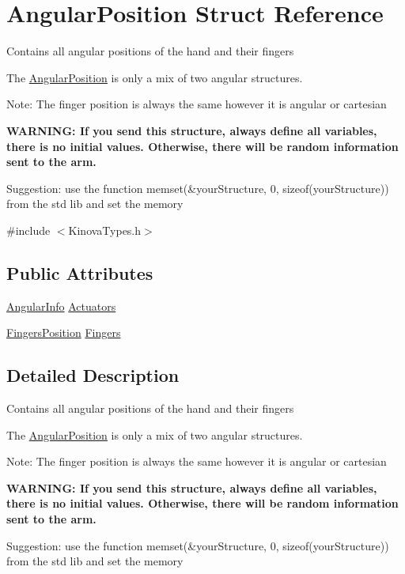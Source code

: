 \hypertarget{struct_angular_position}{\section{Angular\-Position Struct Reference}
\label{struct_angular_position}
}


\par
Contains all angular positions of the hand and their fingers \par
The \hyperlink{struct_angular_position}{Angular\-Position} is only a mix of two angular structures. \par
Note\-: The finger position is always the same however it is angular or cartesian \par
{\bfseries W\-A\-R\-N\-I\-N\-G\-: If you send this structure, always define all variables, there is no initial values. Otherwise, there will be random information sent to the arm.} \par
Suggestion\-: use the function memset(\&your\-Structure, 0, sizeof(your\-Structure)) from the std lib and set the memory  




{\ttfamily \#include $<$Kinova\-Types.\-h$>$}

\subsection*{Public Attributes}
\begin{DoxyCompactItemize}
\item 
\hyperlink{struct_angular_info}{Angular\-Info} \hyperlink{struct_angular_position_a860d625d47a8a6eaae53f43903beb80b}{Actuators}
\item 
\hyperlink{struct_fingers_position}{Fingers\-Position} \hyperlink{struct_angular_position_afdb2a9bede2dde4e8f881175a58e019f}{Fingers}
\end{DoxyCompactItemize}


\subsection{Detailed Description}
\par
Contains all angular positions of the hand and their fingers \par
The \hyperlink{struct_angular_position}{Angular\-Position} is only a mix of two angular structures. \par
Note\-: The finger position is always the same however it is angular or cartesian \par
{\bfseries W\-A\-R\-N\-I\-N\-G\-: If you send this structure, always define all variables, there is no initial values. Otherwise, there will be random information sent to the arm.} \par
Suggestion\-: use the function memset(\&your\-Structure, 0, sizeof(your\-Structure)) from the std lib and set the memory 



